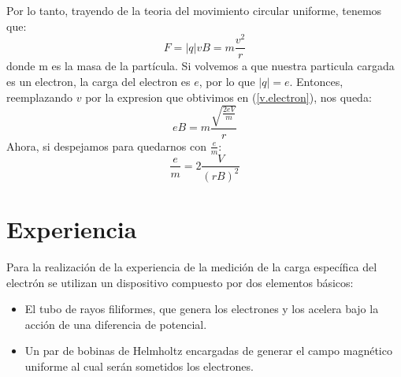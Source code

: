 \documentclass[a4paper,12pt]{report}
\begin{document}
    Por lo tanto, trayendo de la teoria del movimiento circular uniforme, tenemos que:
    \begin{equation*}
        F = |q| v B = m \frac{v^2}{r}
    \end{equation*}
    donde m es la masa de la partícula. 
    Si volvemos a que nuestra particula cargada es un electron, la carga del electron es $e$, por lo que $|q| = e$.
    Entonces, reemplazando $v$ por la expresion que obtivimos en (\ref{v.electron}), nos queda:
    \begin{equation*}
        e B = m \frac{\sqrt{\frac{2 eV}{m}}}{r}
    \end{equation*}
    Ahora, si despejamos para quedarnos con $\frac{e}{m}$:
    \begin{equation}
        \label{relac.e/m}
        \frac{e}{m} = 2 \frac{V}{(r B)^2}
    \end{equation}

\chapter{Experiencia}
    Para la realización de la experiencia de la medición de la carga específica del electrón se utilizan un dispositivo
    compuesto por dos elementos básicos:
    \begin{itemize}
        \item El tubo de rayos filiformes, que genera los electrones y los acelera bajo la acción de una diferencia de
            potencial.
        \item Un par de bobinas de Helmholtz encargadas de generar el campo magnético uniforme al cual serán sometidos
            los electrones.
    \end{itemize}
\end{document}
